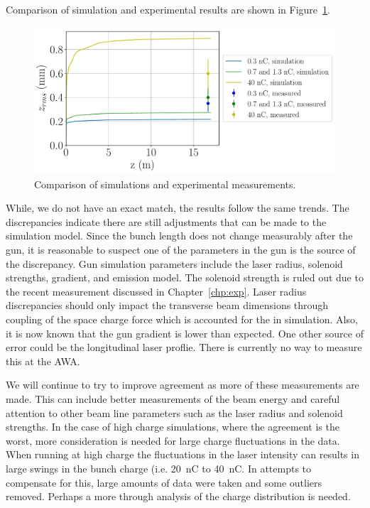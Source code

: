 Comparison of simulation and experimental results are shown in Figure~\ref{sims}.
\begin{figure}%
	\centering
	\includegraphics[width=0.75\linewidth]{images/THPMF048f5}
	\caption{Comparison of simulations and experimental measurements.}
	\label{sims}
\end{figure}
While, we do not have an exact match, the results follow the same trends.
The discrepancies indicate there are still adjustments that can be made
to the simulation model. Since the bunch length does not change measurably 
after the gun, it is reasonable to suspect one of the parameters in the 
gun is the source of the discrepancy. Gun simulation parameters include the laser radius, 
solenoid strengths, gradient, and emission model. The solenoid strength is ruled 
out due to the recent measurement discussed in Chapter~\ref{chp:exp}. 
Laser radius discrepancies should only impact the transverse beam dimensions 
through coupling of the space charge force which is accounted for the in simulation. 
Also, it is now known that the gun gradient is lower than expected.
One other source of error could be the longitudinal laser proflie.
There is currently no way to measure this at the AWA. 

We will continue to try to improve agreement as more of these measurements are made. 
This can include better measurements of the beam energy and careful attention to other 
beam line parameters such as the laser radius and solenoid strengths.
In the case of high charge simulations, where the agreement is the worst, 
more consideration is needed for large charge fluctuations in the data.
When running at high charge the fluctuations in the laser intensity can results in 
large swings in the bunch charge (i.e. \SI{20}{nC} to \SI{40}{nC}. 
In attempts to compensate for this, large amounts of data were taken and some 
outliers removed. Perhaps a more through analysis of the charge distribution is needed. 

